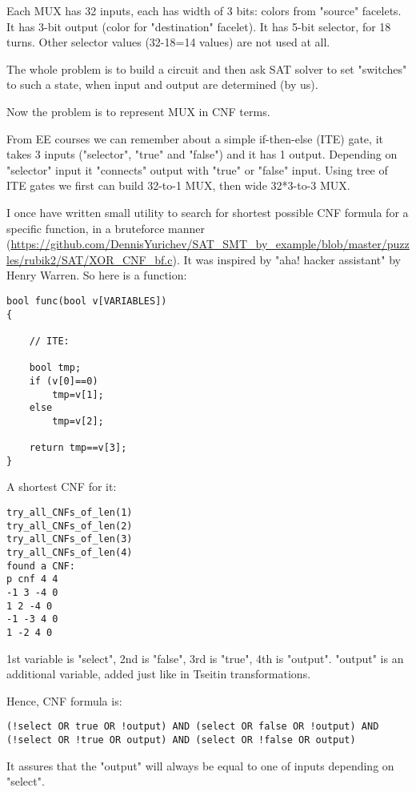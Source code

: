 Each MUX has 32 inputs, each has width of 3 bits: colors from "source" facelets.
It has 3-bit output (color for "destination" facelet).
It has 5-bit selector, for 18 turns. Other selector values (32-18=14 values) are not used at all.

The whole problem is to build a circuit and then ask SAT solver to set "switches" to such a state,
when input and output are determined (by us).

Now the problem is to represent MUX in CNF terms.

From \ac{EE} courses we can remember about a simple if-then-else (ITE) gate, it takes 3 inputs
("selector", "true" and "false") and it has 1 output.
Depending on "selector" input it "connects" output with "true" or "false" input.
Using tree of ITE gates we first can build 32-to-1 MUX, then wide 32*3-to-3 MUX.

I once have written small utility to search for shortest possible CNF formula for a specific function,
in a bruteforce manner (\url{https://github.com/DennisYurichev/SAT_SMT_by_example/blob/master/puzzles/rubik2/SAT/XOR_CNF_bf.c}).
It was inspired by "aha! hacker assistant" by Henry Warren.
So here is a function:

\begin{lstlisting}[style=customc]
bool func(bool v[VARIABLES])
{

	// ITE:

	bool tmp;
	if (v[0]==0)
		tmp=v[1];
	else
		tmp=v[2];

	return tmp==v[3];
}
\end{lstlisting}

A shortest CNF for it:

\begin{lstlisting}
try_all_CNFs_of_len(1)
try_all_CNFs_of_len(2)
try_all_CNFs_of_len(3)
try_all_CNFs_of_len(4)
found a CNF:
p cnf 4 4
-1 3 -4 0
1 2 -4 0
-1 -3 4 0
1 -2 4 0
\end{lstlisting}

1st variable is "select", 2nd is "false", 3rd is "true", 4th is "output".
"output" is an additional variable, added just like in Tseitin transformations.

Hence, CNF formula is:

\begin{lstlisting}
(!select OR true OR !output) AND (select OR false OR !output) AND (!select OR !true OR output) AND (select OR !false OR output)
\end{lstlisting}

It assures that the "output" will always be equal to one of inputs depending on "select".

